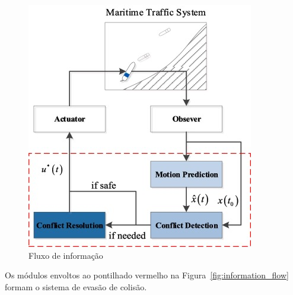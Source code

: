         \begin{figure}
            \centering
            \includegraphics{fig/information_flow.png}
            \caption{Fluxo de informação ~\cite{HUANG2020451}}
            \label{fig:col_avoid_info_flow}
        \end{figure}
        
        Os módulos envoltos ao pontilhado vermelho na Figura~\ref{fig:information_flow} formam o sistema de evasão de colisão. 
        
    \subsection{}
